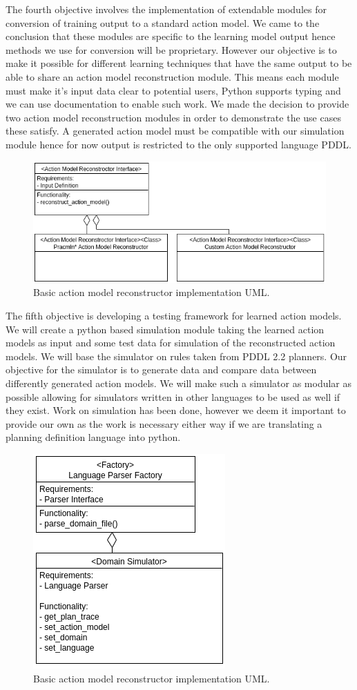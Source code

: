 The fourth objective involves the implementation of extendable modules for conversion of training output to a standard action model. We came to the conclusion that these modules are specific to the learning model output hence methods we use for conversion will be proprietary. However our objective is to make it possible for different learning techniques that have the same output to be able to share an action model reconstruction module. This means each module must make it's input data clear to potential users, Python supports typing and we can use documentation to enable such work. We made the decision to provide two action model reconstruction modules in order to demonstrate the use cases these satisfy. A generated action model must be compatible with our simulation module hence for now output is restricted to the only supported language PDDL.
\begin{figure}[h]
    \centering
    \includegraphics[width=0.7\linewidth]{images/architecture/action_model_reconstructor_uml}
    \caption{Basic action model reconstructor implementation UML.}
    \label{fig:action-model-reconstructor-uml}
\end{figure}
\newpage
The fifth objective is developing a testing framework for learned action models. We will create a python based simulation module taking the learned action models as input and some test data for simulation of the reconstructed action models. We will base the simulator on rules taken from PDDL 2.2 planners. Our objective for the simulator is to generate data and compare data between differently generated action models. We will make such a simulator as modular as possible allowing for simulators written in other languages to be used as well if they exist. Work on simulation has been done, however we deem it important to provide our own as the work is necessary either way if we are translating a planning definition language into python.
\begin{figure}[h]
    \centering
    \includegraphics[width=0.4\linewidth]{images/architecture/domain_simulator}
    \caption{Basic action model reconstructor implementation UML.}
    \label{fig:domain-simulator-uml}
\end{figure}

